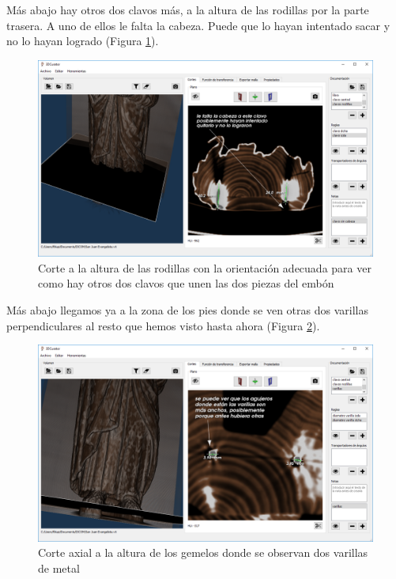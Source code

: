 Más abajo hay otros dos clavos más, a la altura de las rodillas por la parte trasera. A uno de ellos le falta la cabeza. Puede que lo hayan intentado sacar y no lo hayan logrado (Figura \ref{fig:resultados/documentacion/san-juan-evangelista/clavos-rodillas}). 

\begin{figure}[H]
	\centering
	\includegraphics[width=12.5cm]{imagenes/resultados/documentacion/san-juan-evangelista/clavos-rodillas}
	\caption{Corte a la altura de las rodillas con la orientación adecuada para ver como hay otros dos clavos que unen las dos piezas del embón}
	\label{fig:resultados/documentacion/san-juan-evangelista/clavos-rodillas}
\end{figure}

Más abajo llegamos ya a la zona de los pies donde se ven otras dos varillas perpendiculares al resto que hemos visto hasta ahora (Figura \ref{fig:resultados/documentacion/san-juan-evangelista/varillas}). 

\begin{figure}[H]
	\centering
	\includegraphics[width=12.5cm]{imagenes/resultados/documentacion/san-juan-evangelista/varillas}
	\caption{Corte axial a la altura de los gemelos donde se observan dos varillas de metal}
	\label{fig:resultados/documentacion/san-juan-evangelista/varillas}
\end{figure} 

